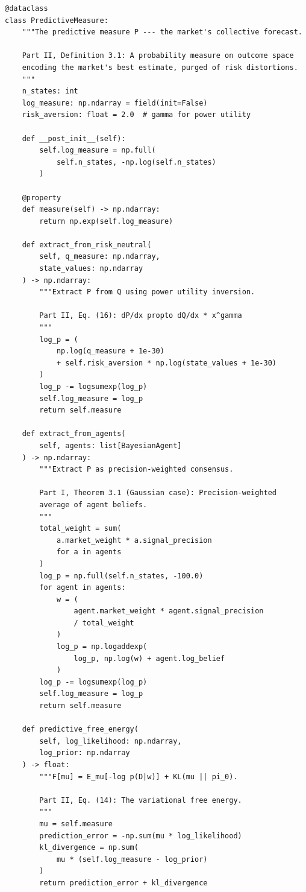 \documentclass[12pt,a4paper]{article}
\theoremstyle{definition}
\begin{document}
\begin{lstlisting}[caption={Predictive Measure --- Extraction and evaluation (Part~II, \S 3--5)},label=lst:predictive]
@dataclass
class PredictiveMeasure:
    """The predictive measure P --- the market's collective forecast.
    
    Part II, Definition 3.1: A probability measure on outcome space
    encoding the market's best estimate, purged of risk distortions.
    """
    n_states: int
    log_measure: np.ndarray = field(init=False)
    risk_aversion: float = 2.0  # gamma for power utility
    
    def __post_init__(self):
        self.log_measure = np.full(
            self.n_states, -np.log(self.n_states)
        )
    
    @property
    def measure(self) -> np.ndarray:
        return np.exp(self.log_measure)
    
    def extract_from_risk_neutral(
        self, q_measure: np.ndarray,
        state_values: np.ndarray
    ) -> np.ndarray:
        """Extract P from Q using power utility inversion.
        
        Part II, Eq. (16): dP/dx propto dQ/dx * x^gamma
        """
        log_p = (
            np.log(q_measure + 1e-30)
            + self.risk_aversion * np.log(state_values + 1e-30)
        )
        log_p -= logsumexp(log_p)
        self.log_measure = log_p
        return self.measure
    
    def extract_from_agents(
        self, agents: list[BayesianAgent]
    ) -> np.ndarray:
        """Extract P as precision-weighted consensus.
        
        Part I, Theorem 3.1 (Gaussian case): Precision-weighted
        average of agent beliefs.
        """
        total_weight = sum(
            a.market_weight * a.signal_precision
            for a in agents
        )
        log_p = np.full(self.n_states, -100.0)
        for agent in agents:
            w = (
                agent.market_weight * agent.signal_precision
                / total_weight
            )
            log_p = np.logaddexp(
                log_p, np.log(w) + agent.log_belief
            )
        log_p -= logsumexp(log_p)
        self.log_measure = log_p
        return self.measure
    
    def predictive_free_energy(
        self, log_likelihood: np.ndarray,
        log_prior: np.ndarray
    ) -> float:
        """F[mu] = E_mu[-log p(D|w)] + KL(mu || pi_0).
        
        Part II, Eq. (14): The variational free energy.
        """
        mu = self.measure
        prediction_error = -np.sum(mu * log_likelihood)
        kl_divergence = np.sum(
            mu * (self.log_measure - log_prior)
        )
        return prediction_error + kl_divergence
    

\end{lstlisting}
\end{document}
